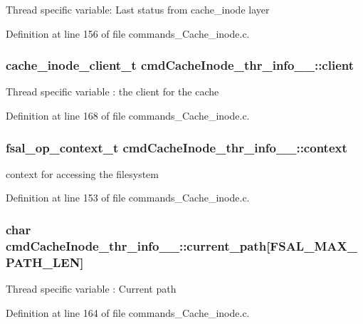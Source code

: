 Thread specific variable: Last status from cache\_\-inode layer 

Definition at line 156 of file commands\_\-Cache\_\-inode.c.
\subsubsection[{client}]{\setlength{\rightskip}{0pt plus 5cm}cache\_\-inode\_\-client\_\-t {\bf cmdCacheInode\_\-thr\_\-info\_\-\_\-::client}}\label{structcmdCacheInode__thr__info_____4381d3125d193f2d065276612d86346a}


Thread specific variable : the client for the cache 

Definition at line 168 of file commands\_\-Cache\_\-inode.c.
\subsubsection[{context}]{\setlength{\rightskip}{0pt plus 5cm}fsal\_\-op\_\-context\_\-t {\bf cmdCacheInode\_\-thr\_\-info\_\-\_\-::context}}\label{structcmdCacheInode__thr__info_____e86fa9145c15ef4818e7bf8a1669960b}


context for accessing the filesystem 

Definition at line 153 of file commands\_\-Cache\_\-inode.c.
\subsubsection[{current\_\-path}]{\setlength{\rightskip}{0pt plus 5cm}char {\bf cmdCacheInode\_\-thr\_\-info\_\-\_\-::current\_\-path}[FSAL\_\-MAX\_\-PATH\_\-LEN]}\label{structcmdCacheInode__thr__info_____86a2ee4d04743a3019167b2d5b611c90}


Thread specific variable : Current path 

Definition at line 164 of file commands\_\-Cache\_\-inode.c.
